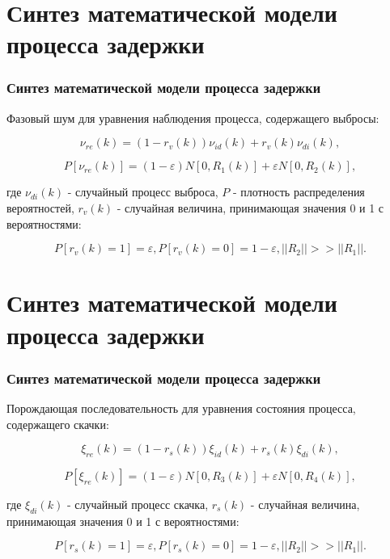 \documentclass[10pt,pdf,hyperref={unicode}]{beamer}
\begin{document}
\section{Синтез математической модели процесса задержки}
\begin{frame}
\frametitle{Синтез математической модели процесса задержки}
Фазовый шум для уравнения наблюдения процесса, содержащего выбросы:


\begin{equation}\label{eq3:v}
\nu_{re}(k)=(1-r_v(k))\nu_{id}(k)+r_v(k)\nu_{di}(k),
\end{equation}

\begin{equation}\label{eq3:vp}
P[\nu_{re}(k)]=(1-\varepsilon)N[0,R_1(k)]+\varepsilon N[0,R_2(k)],
\end{equation}

где $\nu_{di}(k)$ - случайный процесс выброса, $P$ - плотность распределения вероятностей, $r_v(k)$ - случайная величина, принимающая значения 0 и 1 с вероятностями:

\begin{equation}\label{eq3:vpp}
P[r_v(k)=1]=\varepsilon, P[r_v(k)=0]=1-\varepsilon, ||R_2||>>||R_1||.
\end{equation}

\end{frame}


\section{Синтез математической модели процесса задержки}
\begin{frame}
\frametitle{Синтез математической модели процесса задержки}
Порождающая последовательность для уравнения состояния процесса, содержащего скачки:

\begin{equation}\label{eq3:s}
\xi_{re}(k)=(1-r_s(k))\xi_{id}(k)+r_s(k)\xi_{di}(k),
\end{equation}

\begin{equation}\label{eq3:sp}
P[\xi_{re}(k)]=(1-\varepsilon)N[0,R_3(k)]+\varepsilon N[0,R_4(k)],
\end{equation}

\noindent где $\xi_{di}(k)$ - случайный процесс скачка, $r_s(k)$ - случайная величина, принимающая значения 0 и 1 с вероятностями:

\begin{equation}\label{eq3:spp}
P[r_s(k)=1]=\varepsilon, P[r_s(k)=0]=1-\varepsilon, ||R_2||>>||R_1||.
\end{equation}

\end{frame}
\end{document}
